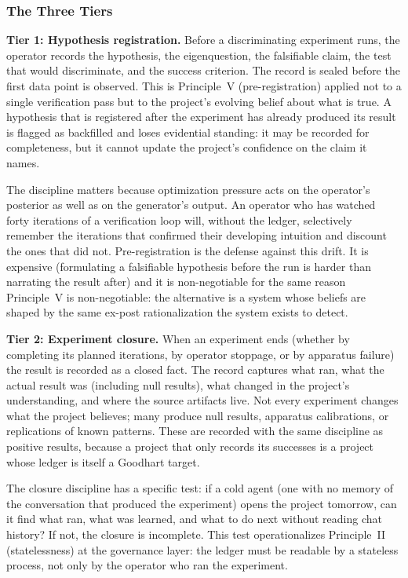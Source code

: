 \documentclass[11pt]{article}
\begin{document}
\subsubsection*{The Three Tiers}

\textbf{Tier 1: Hypothesis registration.} Before a discriminating experiment runs, the operator records the hypothesis, the eigenquestion, the falsifiable claim, the test that would discriminate, and the success criterion. The record is sealed before the first data point is observed. This is Principle~V (pre-registration) applied not to a single verification pass but to the project's evolving belief about what is true. A hypothesis that is registered after the experiment has already produced its result is flagged as backfilled and loses evidential standing: it may be recorded for completeness, but it cannot update the project's confidence on the claim it names.

The discipline matters because optimization pressure acts on the operator's posterior as well as on the generator's output. An operator who has watched forty iterations of a verification loop will, without the ledger, selectively remember the iterations that confirmed their developing intuition and discount the ones that did not. Pre-registration is the defense against this drift. It is expensive (formulating a falsifiable hypothesis before the run is harder than narrating the result after) and it is non-negotiable for the same reason Principle~V is non-negotiable: the alternative is a system whose beliefs are shaped by the same ex-post rationalization the system exists to detect.

\textbf{Tier 2: Experiment closure.} When an experiment ends (whether by completing its planned iterations, by operator stoppage, or by apparatus failure) the result is recorded as a closed fact. The record captures what ran, what the actual result was (including null results), what changed in the project's understanding, and where the source artifacts live. Not every experiment changes what the project believes; many produce null results, apparatus calibrations, or replications of known patterns. These are recorded with the same discipline as positive results, because a project that only records its successes is a project whose ledger is itself a Goodhart target.

The closure discipline has a specific test: if a cold agent (one with no memory of the conversation that produced the experiment) opens the project tomorrow, can it find what ran, what was learned, and what to do next without reading chat history? If not, the closure is incomplete. This test operationalizes Principle~II (statelessness) at the governance layer: the ledger must be readable by a stateless process, not only by the operator who ran the experiment.
\end{document}
